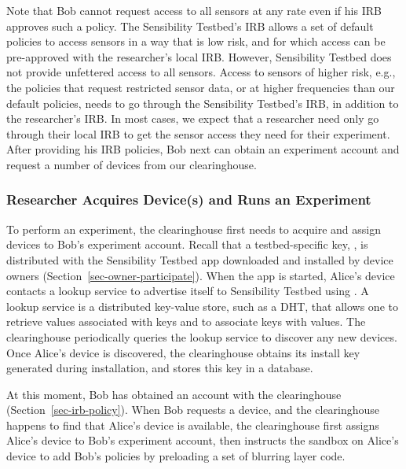 Note that Bob cannot request access to all sensors at any rate
even if his IRB approves such a policy. The Sensibility Testbed's
IRB allows a set of default policies to access sensors in a
way that is low risk, and for which access can be pre-approved with the
researcher's local IRB. However, Sensibility Testbed does not
provide unfettered access to all sensors. Access to sensors of
higher risk, e.g., the policies that request restricted sensor data, 
or at higher frequencies than our default policies, 
needs to go through the Sensibility Testbed's IRB,
in addition to the researcher's IRB. In most cases, we expect
that a researcher need only go through their local IRB to get
the sensor access they need for their experiment. After
providing his IRB policies, Bob next can obtain an experiment
account and request a number of devices from our clearinghouse.

\subsubsection{Researcher Acquires Device(s) and Runs an
Experiment}\label{sec-acquire-run}

To perform an experiment, the clearinghouse first needs to 
acquire and assign devices to Bob's experiment account. 
Recall that a testbed-specific key, , is distributed
with the Sensibility Testbed app downloaded and installed by device
owners (Section~\ref{sec-owner-participate}). When the app is started, 
Alice's device contacts a lookup service to advertise itself to Sensibility 
Testbed using . A lookup service is a distributed
key-value store, such as a DHT, that allows one to retrieve values 
associated with keys and to associate keys with values. 
The clearinghouse periodically queries the lookup service to
discover any new devices. Once Alice's device is discovered, the
clearinghouse obtains its install key  generated
during installation, and stores this key in a database. 

At this moment,  Bob has obtained an account with the clearinghouse 
(Section~\ref{sec-irb-policy}).
When Bob requests a device, and the clearinghouse
happens to find that Alice's device is available, the
clearinghouse first 
assigns Alice's device to Bob's experiment account, then instructs 
the sandbox on Alice's device to add Bob's policies by preloading
a set of blurring layer code.

